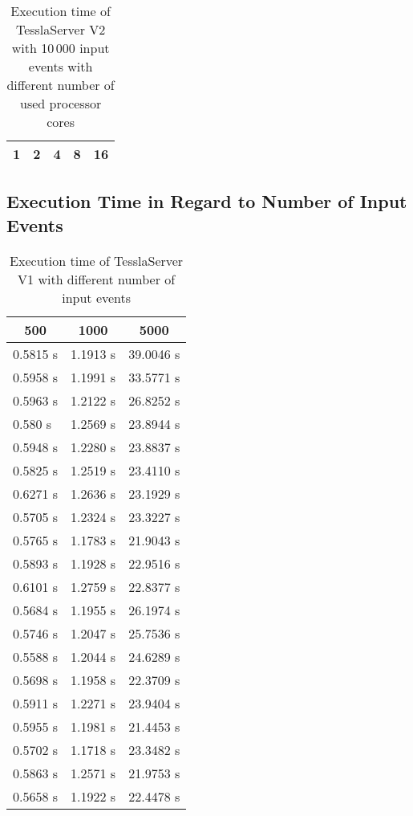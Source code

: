 \begin{table}[!htb]
  \centering
  \caption{Execution time of TesslaServer V2 with 10\,000 input events with different number of used processor cores}
  \label{table:tessla_server_v2_num_cores_data}
  \begin{tabular}{lllll}
    \multicolumn{1}{c}{1} & \multicolumn{1}{c}{2} & \multicolumn{1}{c}{4} & \multicolumn{1}{c}{8} & \multicolumn{1}{c}{16} \\ \hline
  \end{tabular}
\end{table}

\clearpage

\subsection{Execution Time in Regard to Number of Input Events}
\label{sec:appendix:runtime_benchmark_data:execution_time_cores}

\begin{table}[!htb]
  \centering
  \caption{Execution time of TesslaServer V1 with different number of input events}
  \label{table:tessla_server_v1_events_num_events_data}
  \begin{tabular}{lll}
    \multicolumn{1}{c}{500} & \multicolumn{1}{c}{1000} & \multicolumn{1}{c}{5000} \\ \hline
    0.5815 s & 1.1913 s & 39.0046 s \\
    0.5958 s & 1.1991 s & 33.5771 s \\
    0.5963 s & 1.2122 s & 26.8252 s \\
    0.580 s  & 1.2569 s & 23.8944 s \\
    0.5948 s & 1.2280 s & 23.8837 s \\
    0.5825 s & 1.2519 s & 23.4110 s \\
    0.6271 s & 1.2636 s & 23.1929 s \\
    0.5705 s & 1.2324 s & 23.3227 s \\
    0.5765 s & 1.1783 s & 21.9043 s \\
    0.5893 s & 1.1928 s & 22.9516 s \\
    0.6101 s & 1.2759 s & 22.8377 s \\
    0.5684 s & 1.1955 s & 26.1974 s \\
    0.5746 s & 1.2047 s & 25.7536 s \\
    0.5588 s & 1.2044 s & 24.6289 s \\
    0.5698 s & 1.1958 s & 22.3709 s \\
    0.5911 s & 1.2271 s & 23.9404 s \\
    0.5955 s & 1.1981 s & 21.4453 s \\
    0.5702 s & 1.1718 s & 23.3482 s \\
    0.5863 s & 1.2571 s & 21.9753 s \\
    0.5658 s & 1.1922 s & 22.4478 s
  \end{tabular}
\end{table}

